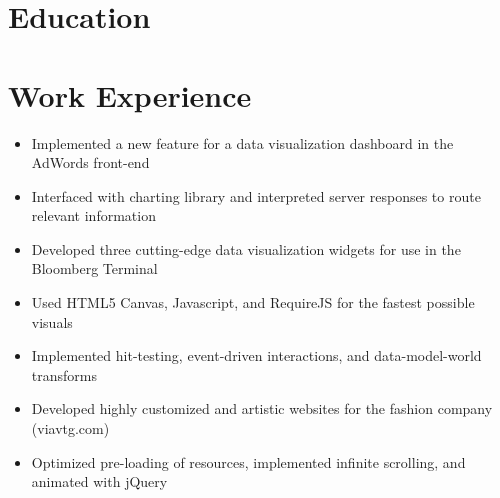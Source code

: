 \documentclass{zres}
\begin{document}
\begin{resume}

\section{Education}



\section{Work Experience}

\begin{itemize}[leftmargin=10pt]
  \item Implemented a new feature for a data visualization dashboard in the AdWords front-end
  \item Interfaced with charting library and interpreted server responses to route relevant information
\end{itemize}

\begin{itemize}[leftmargin=10pt]
  \item Developed three cutting-edge data visualization widgets for use in the Bloomberg Terminal
  \item Used HTML5 Canvas, Javascript, and RequireJS for the fastest possible visuals
  \item Implemented hit-testing, event-driven interactions, and data-model-world transforms
\end{itemize}

\begin{itemize}[leftmargin=10pt]
  \item Developed highly customized and artistic websites for the fashion company (viavtg.com)
  \item Optimized pre-loading of resources, implemented infinite scrolling, and animated with jQuery
\end{itemize}


\end{resume}
\end{document}

